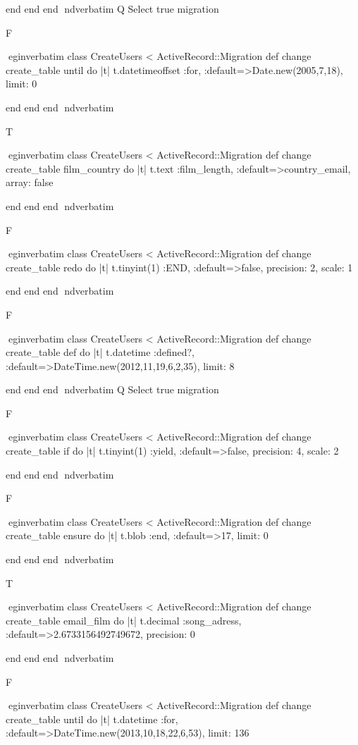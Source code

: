     end 
  end 
end
nd{verbatim}
Q
 Select true migration

F

egin{verbatim}
 class CreateUsers < ActiveRecord::Migration 
  def change 
    create_table until do |t| 
      t.datetimeoffset :for, :default=>Date.new(2005,7,18), limit: 0
    
    end 
  end 
end
nd{verbatim}

T

egin{verbatim}
 class CreateUsers < ActiveRecord::Migration 
  def change 
    create_table film_country do |t| 
      t.text :film_length, :default=>country_email, array: false
    
    end 
  end 
end
nd{verbatim}

F

egin{verbatim}
 class CreateUsers < ActiveRecord::Migration 
  def change 
    create_table redo do |t| 
      t.tinyint(1) :END, :default=>false, precision: 2, scale: 1
    
    end 
  end 
end
nd{verbatim}

F

egin{verbatim}
 class CreateUsers < ActiveRecord::Migration 
  def change 
    create_table def do |t| 
      t.datetime :defined?, :default=>DateTime.new(2012,11,19,6,2,35), limit: 8
    
    end 
  end 
end
nd{verbatim}
Q
 Select true migration

F

egin{verbatim}
 class CreateUsers < ActiveRecord::Migration 
  def change 
    create_table if do |t| 
      t.tinyint(1) :yield, :default=>false, precision: 4, scale: 2
    
    end 
  end 
end
nd{verbatim}

F

egin{verbatim}
 class CreateUsers < ActiveRecord::Migration 
  def change 
    create_table ensure do |t| 
      t.blob :end, :default=>17, limit: 0
    
    end 
  end 
end
nd{verbatim}

T

egin{verbatim}
 class CreateUsers < ActiveRecord::Migration 
  def change 
    create_table email_film do |t| 
      t.decimal :song_adress, :default=>2.6733156492749672, precision: 0
    
    end 
  end 
end
nd{verbatim}

F

egin{verbatim}
 class CreateUsers < ActiveRecord::Migration 
  def change 
    create_table until do |t| 
      t.datetime :for, :default=>DateTime.new(2013,10,18,22,6,53), limit: 136
    
